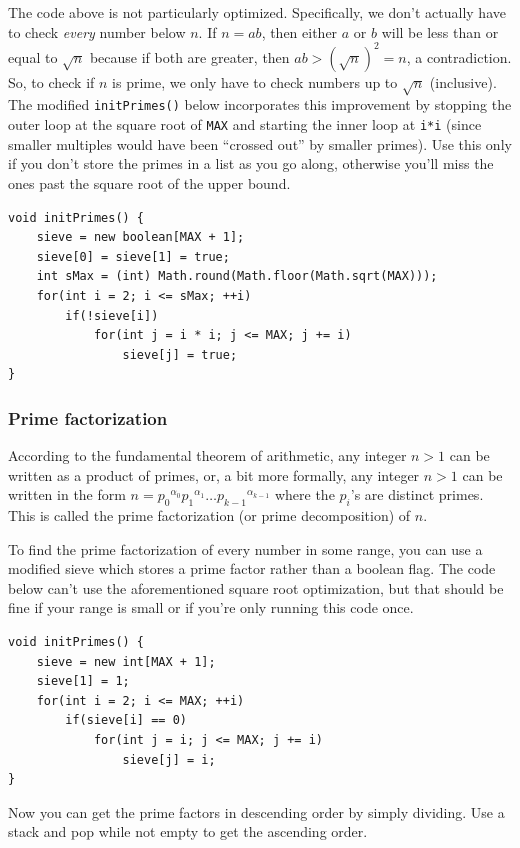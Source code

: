 \documentclass[a4paper,12pt]{article}
\begin{document}
The code above is not particularly optimized. Specifically, we don't actually have to check {\em every} number below $n$. If $n=ab$, then either $a$ or $b$ will be less than or equal to $\sqrt{n}$ because if both are greater, then $ab>\left(\sqrt{n}\right)^2=n$, a contradiction. So, to check if $n$ is prime, we only have to check numbers up to $\sqrt{n}$ (inclusive). The modified \verb/initPrimes()/ below incorporates this improvement by stopping the outer loop at the square root of \verb/MAX/ and starting the inner loop at \verb/i*i/ (since smaller multiples would have been ``crossed out'' by smaller primes). Use this only if you don't store the primes in a list as you go along, otherwise you'll miss the ones past the square root of the upper bound.

\begin{lstlisting}
void initPrimes() {
	sieve = new boolean[MAX + 1];
	sieve[0] = sieve[1] = true;
	int sMax = (int) Math.round(Math.floor(Math.sqrt(MAX)));
	for(int i = 2; i <= sMax; ++i)
		if(!sieve[i])
			for(int j = i * i; j <= MAX; j += i)
				sieve[j] = true;
}
\end{lstlisting}

\subsubsection{Prime factorization}

According to the fundamental theorem of arithmetic, any integer $n>1$ can be written as a product of primes, or, a bit more formally, any integer $n>1$ can be written in the form $n={p_0}^{\alpha_0}{p_1}^{\alpha_1}\ldots{p_{k-1}}^{\alpha_{k-1}}$ where the $p_i$'s are distinct primes. This is called the prime factorization (or prime decomposition) of $n$.

To find the prime factorization of every number in some range, you can use a modified sieve which stores a prime factor rather than a boolean flag. The code below can't use the aforementioned square root optimization, but that should be fine if your range is small or if you're only running this code once.

\begin{lstlisting}
void initPrimes() {
	sieve = new int[MAX + 1];
	sieve[1] = 1;
	for(int i = 2; i <= MAX; ++i)
		if(sieve[i] == 0)
			for(int j = i; j <= MAX; j += i)
				sieve[j] = i;
}
\end{lstlisting}

\noindent Now you can get the prime factors in descending order by simply dividing. Use a stack and pop while not empty to get the ascending order.
\end{document}
